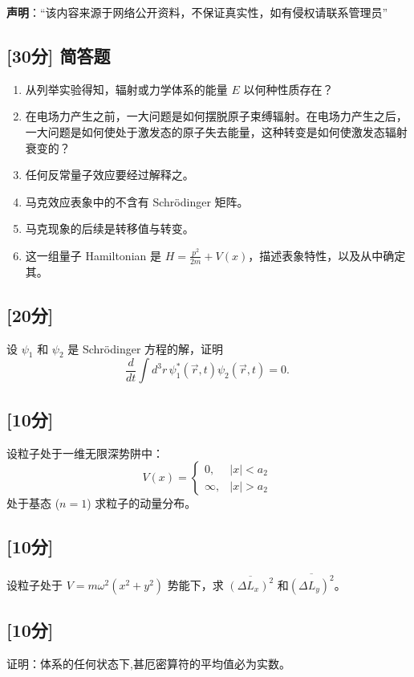 
\textbf{声明}：“该内容来源于网络公开资料，不保证真实性，如有侵权请联系管理员”

\subsection{[30分] 简答题}
 \begin{enumerate}
        \item 从列举实验得知，辐射或力学体系的能量 $E$ 以何种性质存在？
        \item 在电场力产生之前，一大问题是如何摆脱原子束缚辐射。在电场力产生之后，一大问题是如何使处于激发态的原子失去能量，这种转变是如何使激发态辐射衰变的？
        \item 任何反常量子效应要经过解释之。
        \item 马克效应表象中的不含有 Schrödinger 矩阵。
        \item 马克现象的后续是转移值与转变。
        \item 这一组量子 Hamiltonian 是 $H = \frac{p^2}{2m} + V(x)$，描述表象特性，以及从中确定其。
    \end{enumerate}

\subsection{[20分]}
设 $\psi_1$ 和 $\psi_2$ 是 Schrödinger 方程的解，证明
\[
\frac{d}{dt} \int d^3r \, \psi_1^* (\vec{r}, t) \psi_2 (\vec{r}, t) = 0.~
\]

\subsection{[10分]}
设粒子处于一维无限深势阱中：
\[
V(x) =
\begin{cases}
0, & |x| < a_2 \\
\infty, & |x| > a_2
\end{cases}~
\]
处于基态 ($n=1$) 求粒子的动量分布。

\subsection{[10分]}
设粒子处于 $V = m\omega^2 (x^2 + y^2)$ 势能下，求 $\overline{(\Delta L_x)^2}$ 和$\overline{(\Delta L_y)^2}$。

\subsection{[10分]}
证明：体系的任何状态下,甚厄密算符的平均值必为实数。